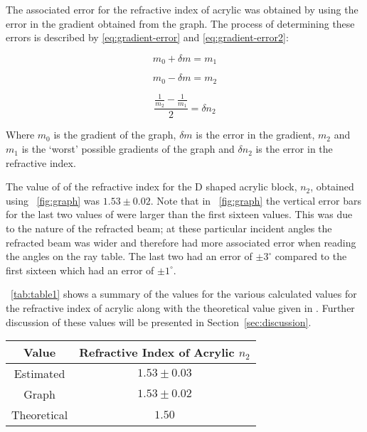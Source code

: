 \documentclass{article}
\newcommand{\figref}[2][\figurename~]{#1\ref{#2}}
\newcommand{\tabref}[2][\tablename~]{#1\ref{#2}}
\newcommand{\secref}[2][Section~]{#1\ref{#2}}
\begin{document}
\vspace{2mm}
\noindent
The associated error for the refractive index of acrylic was obtained by using the error in the gradient obtained from the graph. The process of determining these errors is described by \eqref{eq:gradient-error} and \eqref{eq:gradient-error2}:

\begin{equation}
\label{eq:gradient-error}
m_{0} + \delta{m} = m_{1}
\end{equation}

\begin{equation}
\label{eq:gradient-error}
m_{0} - \delta{m} = m_{2}
\end{equation}

\begin{equation}
\label{eq:gradient-error2}
\frac{\frac{1}{m_{2}} - \frac{1}{m_{1}}}{2} = \delta{n_2}
\end{equation} 

\vspace{2mm}
\noindent
Where $m_{0}$ is the gradient of the graph, $\delta{m}$ is the error in the gradient, $m_{2}$ and $m_{1}$ is the `worst' possible gradients of the graph and $\delta{n_2}$ is the error in the refractive index.

\vspace{2mm}
\noindent
The value of of the refractive index for the D shaped acrylic block, $n_2$, obtained using \figref{fig:graph} was $1.53 \pm 0.02$. 
Note that in \figref{fig:graph} the vertical error bars for the last two values of were larger than the first sixteen values. This was due to the nature of the refracted beam; at these particular incident angles the refracted beam was wider and therefore had more associated error when reading the angles on the ray table. The last two had an error of $\pm3^{\circ}$ compared to the first sixteen which had an error of $\pm1^{\circ}$.


\vspace{70mm}
\noindent
\tabref{tab:table1} shows a summary of the values for the various calculated values for the refractive index of acrylic along with the theoretical value given in \cite{Paper01}. Further discussion of these values will be presented in \secref{sec:discussion}.

\vspace{5mm}
\begin{table*}[h]
\centering %
\caption{Table of Values and for the Refractive Index of Acrylic}
\label{tab:table1}
\begin{tabular}{|c|c|}
\hline
Value & Refractive Index of Acrylic $n_2$ \\
\hline
Estimated & $1.53 \pm 0.03$  \\
\hline
Graph & $1.53 \pm 0.02$ \\
\hline
Theoretical \cite{Paper01} & $1.50$ \\
\hline
\end{tabular}
\end{table*}
\end{document}
